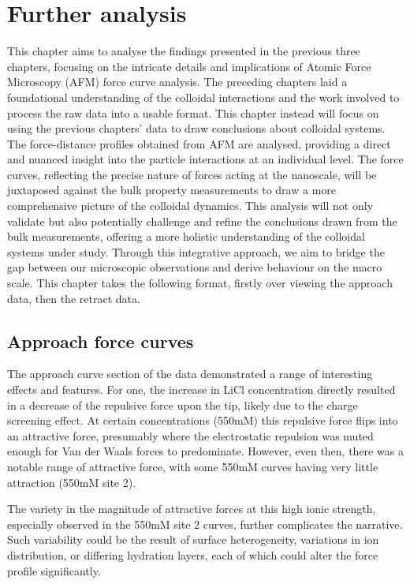 \chapter{Further analysis}

This chapter aims to analyse the findings presented in the previous three chapters, focusing on the intricate details and implications of Atomic Force Microscopy (AFM) force curve analysis. The preceding chapters laid a foundational understanding of the colloidal interactions and the work involved to process the raw data into a usable format. This chapter instead will focus on using the previous chapters' data to draw conclusions about colloidal systems. The force-distance profiles obtained from AFM are analysed, providing a direct and nuanced insight into the particle interactions at an individual level. The force curves, reflecting the precise nature of forces acting at the nanoscale, will be juxtaposed against the bulk property measurements to draw a more comprehensive picture of the colloidal dynamics. This analysis will not only validate but also potentially challenge and refine the conclusions drawn from the bulk measurements, offering a more holistic understanding of the colloidal systems under study. Through this integrative approach, we aim to bridge the gap between our microscopic observations and derive behaviour on the macro scale. This chapter takes the following format, firstly over viewing the approach data, then the retract data.

\section{Approach force curves}

The approach curve section of the data demonstrated a range of interesting effects and features. For one, the increase in LiCl concentration directly resulted in a decrease of the repulsive force upon the tip, likely due to the charge screening effect. At certain concentrations (550mM) this repulsive force flips into an attractive force, presumably where the electrostatic repulsion was muted enough for Van der Waals forces to predominate. However, even then, there was a notable range of attractive force, with some 550mM curves having very little attraction (550mM site 2). 

The variety in the magnitude of attractive forces at this high ionic strength, especially observed in the 550mM site 2 curves, further complicates the narrative. Such variability could be the result of surface heterogeneity, variations in ion distribution, or differing hydration layers, each of which could alter the force profile significantly.

